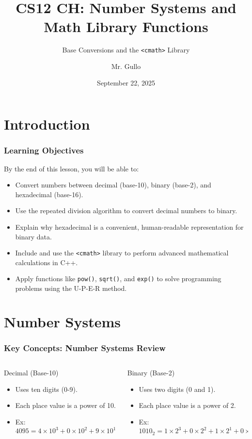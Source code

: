 \documentclass{beamer}
\title[Number Systems and Math]{CS12 CH: Number Systems and Math Library Functions}
\subtitle{Base Conversions and the \texttt{<cmath>} Library}
\author[Mr. Gullo]{Mr. Gullo}
\date[Sep 22, 2025]{September 22, 2025}
\begin{document}
\frame{\titlepage}

\section{Introduction}

\begin{frame}
\frametitle{Learning Objectives}
By the end of this lesson, you will be able to:
\begin{itemize}
    \item Convert numbers between decimal (base-10), binary (base-2), and hexadecimal (base-16).
    \item Use the repeated division algorithm to convert decimal numbers to binary.
    \item Explain why hexadecimal is a convenient, human-readable representation for binary data.
    \item Include and use the \texttt{<cmath>} library to perform advanced mathematical calculations in C++.
    \item Apply functions like \texttt{pow()}, \texttt{sqrt()}, and \texttt{exp()} to solve programming problems using the U-P-E-R method.
\end{itemize}
\end{frame}

\section{Number Systems}

\begin{frame}
\frametitle{Key Concepts: Number Systems Review}
\begin{columns}[T]
    \begin{column}{0.5\textwidth}
        \begin{block}{Decimal (Base-10)}
            \begin{itemize}
                \item Uses ten digits (0-9).
                \item Each place value is a power of 10.
                \item Ex: $4095 = 4 \times 10^3 + 0 \times 10^2 + 9 \times 10^1 + 5 \times 10^0$
            \end{itemize}
        \end{block}
    \end{column}
    \begin{column}{0.5\textwidth}
        \begin{block}{Binary (Base-2)}
            \begin{itemize}
                \item Uses two digits (0 and 1).
                \item Each place value is a power of 2.
                \item Ex: $1010_2 = 1 \times 2^3 + 0 \times 2^2 + 1 \times 2^1 + 0 \times 2^0 = 10_{10}$
            \end{itemize}
        \end{block}
    \end{column}
\end{columns}
\end{frame}
\end{document}
